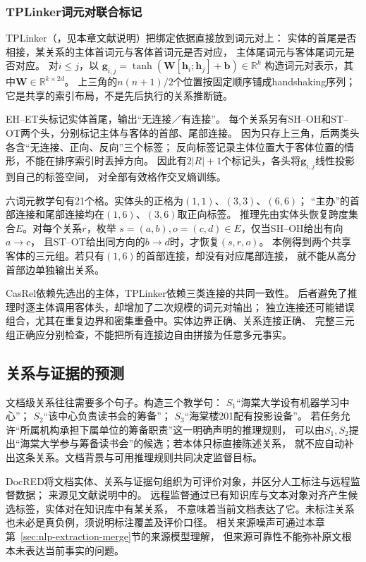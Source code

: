 \subsubsection{TPLinker词元对联合标记}
\label{sec:nlp-extraction-tplinker}

TPLinker（\citeyear{wang2020tplinker}，见本章文献说明）把绑定依据直接放到词元对上：
实体的首尾是否相接，某关系的主体首词元与客体首词元是否对应，
主体尾词元与客体尾词元是否对应。
对$i\leq j$，以
$\bm{g}_{i,j}=\tanh(\bm{W}[\bm{h}_i;\bm{h}_j]+\bm{b})\in\mathbb{R}^{k}$
构造词元对表示，其中$\bm{W}\in\mathbb{R}^{k\times2d}$。
上三角的$n(n+1)/2$个位置按固定顺序铺成handshaking序列；
它是共享的索引布局，不是先后执行的关系推断链。

EH--ET头标记实体首尾，输出“无连接／有连接”。
每个关系另有SH--OH和ST--OT两个头，分别标记主体与客体的首部、尾部连接。
因为只存上三角，后两类头各含“无连接、正向、反向”三个标签；
反向标签记录主体位置大于客体位置的情形，不能在排序索引时丢掉方向。
因此有$2|R|+1$个标记头，各头将$\bm{g}_{i,j}$线性投影到自己的标签空间，
对全部有效格作交叉熵训练。

六词元教学句有21个格。实体头的正格为$(1,1)$、$(3,3)$、$(6,6)$；
“主办”的首部连接和尾部连接均在$(1,6)$、$(3,6)$取正向标签。
推理先由实体头恢复跨度集合$E$。对每个关系$r$，枚举
$s=(a,b),o=(c,d)\in E$，仅当SH--OH给出有向$a\to c$，
且ST--OT给出同方向的$b\to d$时，才恢复$(s,r,o)$。
本例得到两个共享客体的三元组。若只有$(1,6)$的首部连接，却没有对应尾部连接，
就不能从高分首部边单独输出关系。

CasRel依赖先选出的主体，TPLinker依赖三类连接的共同一致性。
后者避免了推理时逐主体调用客体头，却增加了二次规模的词元对输出；
独立连接还可能错误组合，尤其在重复边界和密集重叠中。实体边界正确、关系连接正确、
完整三元组正确应分别检查，不能把所有连接边自由拼接为任意多元事实。

\subsection{关系与证据的预测}
\label{sec:nlp-extraction-relation-evidence}

文档级关系往往需要多个句子。构造三个教学句：
$S_1$“海棠大学设有机器学习中心”；
$S_2$“该中心负责读书会的筹备”；
$S_3$“海棠楼201配有投影设备”。
若任务允许“所属机构承担下属单位的筹备职责”这一明确声明的推理规则，
可以由$S_1,S_2$提出“海棠大学参与筹备读书会”的候选；若本体只标直接陈述关系，
就不应自动补出这条关系。文档背景与可用推理规则共同决定监督目标。

DocRED将文档实体、关系与证据句组织为可评价对象，并区分人工标注与远程监督数据；
来源见文献说明中的。
远程监督通过已有知识库与文本对象对齐产生候选标签，实体对在知识库中有某关系，
不意味着当前文档表达了它。未标注关系也未必是真负例，须说明标注覆盖及评价口径。
相关来源噪声可通过本章第~\ref{sec:nlp-extraction-merge}节的来源模型理解，
但来源可靠性不能弥补原文根本未表达当前事实的问题。

